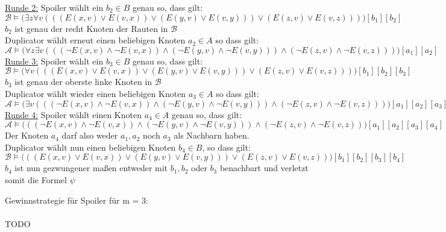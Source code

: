 \documentclass[a4paper,10pt]{article}
\begin{document}
\begin{compactenum} [(a)]
\begin{tabbing}
			\underline{Runde 2:} \> Spoiler wählt ein $ b_2 \in B $ genau so, dass gilt:\\
			\> $ \mathcal{B} \models \big(\exists z \forall v (((E(x,v)\vee E(v,x))\vee  (E(y,v)\vee E(v,y)))\vee (E(z,v)\vee E(v,z)))\big)[b_1][b_2] $ \\
			\> $ b_2 $ ist genau der recht Knoten der Rauten in $ \mathcal{B} $\\
			\> Duplicator wählt erneut einen beliebigen Knoten $ a_2 \in A$ so dass gilt:\\
			\> $ \mathcal{A} \models \big(\forall z \exists v (((\lnot E(x,v)\wedge \lnot E(v,x))\wedge  (\lnot E(y,v)\wedge \lnot E(v,y)))\wedge (\lnot E(z,v)\wedge \lnot E(v,z)))\big) [a_1][a_2] $ \\
			\underline{Runde 3:} \> Spoiler wählt ein $ b_3 \in B $ genau so, dass gilt:\\
			\> $ \mathcal{B} \models \big(\forall v (((E(x,v)\vee E(v,x))\vee  (E(y,v)\vee E(v,y)))\vee (E(z,v)\vee E(v,z)))\big)[b_1][b_2][b_3] $ \\
			\> $ b_3 $ ist genau der oberste linke Knoten in $ \mathcal{B} $\\
			\> Duplicator wählt wieder einen beliebigen Knoten $ a_3 \in A$ so dass gilt:\\
			\> $ \mathcal{A} \models \big(\exists v (((\lnot E(x,v)\wedge \lnot E(v,x))\wedge  (\lnot E(y,v)\wedge \lnot E(v,y)))\wedge (\lnot E(z,v)\wedge \lnot E(v,z)))\big) [a_1][a_2][a_3] $ \\
			\underline{Runde 4:} \> Spoiler wählt einen Knoten $ a_4 \in A$ genau so, dass gilt:\\
			\> $ \mathcal{A} \models \big(((\lnot E(x,v)\wedge \lnot E(v,x))\wedge  (\lnot E(y,v)\wedge \lnot E(v,y)))\wedge (\lnot E(z,v)\wedge \lnot E(v,z))\big) [a_1][a_2][a_3][a_4] $ \\
			\> Der Knoten $ a_4 $ darf also weder $ a_1, a_2 $ noch $ a_3 $ als Nachbarn haben.\\
			\> Duplicator wählt nun einen beliebigen Knoten $ b_4 \in B $, so dass gilt:\\
			\> $ \mathcal{B} \models \big(((E(x,v)\vee E(v,x))\vee  (E(y,v)\vee E(v,y)))\vee (E(z,v)\vee E(v,z))\big)[b_1][b_2][b_3][b_4] $ \\
			\> $ b_4 $ ist nun gezwungener maßen entweder mit $ b_1, b_2 $ oder $ b_3 $ benachbart und verletzt somit die Formel $ \psi $\\
		\end{tabbing}
		
		Gewinnstrategie für Spoiler für m = 3:\\
		\\
		TODO
		\\
		

\end{compactenum}
\end{document}
